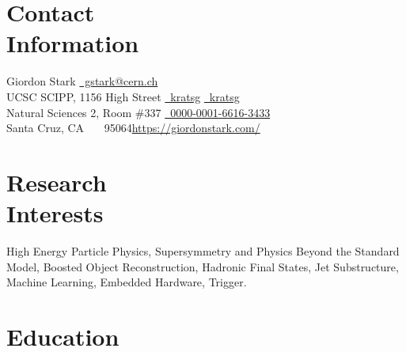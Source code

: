 \documentclass[margin,line]{resume}
\let\origsection\section%
\let\section\subsection%
\let\section\origsection%
\begin{document}
\begin{resume}

\section{\mysidestyle Contact\\Information}

Giordon Stark                 \hfill \href{mailto:gstark@cern.ch}{~gstark@cern.ch}
\vspace{0mm}\\\vspace{0mm}%
UCSC SCIPP, 1156 High Street  \hfill \href{https://github.com/kratsg}{~kratsg} {\large\rmfamily\textbullet} \href{https://twitter.com/kratsg}{~kratsg}
\vspace{0mm}\\\vspace{0mm}%
Natural Sciences 2, Room \#337       \hfill \href{https://orcid.org/0000-0001-6616-3433}{~0000-0001-6616-3433}
\vspace{0mm}\\\vspace{0mm}%
Santa Cruz, CA \ \ \ 95064\hfill\href{https://giordonstark.com/?utm_source=cv}{https://giordonstark.com/}\\
\vspace{-6.5mm}%

\section{\mysidestyle Research\\Interests}
{\small
High Energy Particle Physics, Supersymmetry and Physics Beyond the Standard
Model, Boosted Object Reconstruction, Hadronic Final States, Jet
Substructure, Machine Learning, Embedded Hardware, Trigger.
}
\section{\mysidestyle Education}


\end{resume}
\end{document}
